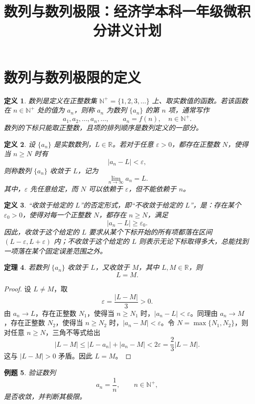 \documentclass[UTF8,fontset=fandol,11pt]{ctexart}
\title{数列与数列极限：经济学本科一年级微积分讲义计划}
\date{}
\newtheorem{definition}{定义}[section]
\newtheorem{theorem}[definition]{定理}
\newtheorem{example}[definition]{例题}
\begin{document}
\maketitle
\section{数列与数列极限的定义}\label{sec:S01}
\begin{definition}
\label{def:sequence}数列是定义在正整数集 $\mathbb{N}^{+}=\{1,2,3,\ldots\}$ 上、取实数值的函数。若该函数在 $n\in\mathbb{N}^{+}$ 处的值为 $a_n$，则称 $a_n$ 为数列 $\{a_n\}$ 的第 $n$ 项，通常写作
\[
a_1,a_2,\ldots,a_n,\ldots,
\qquad a_n=f(n),\quad n\in\mathbb{N}^{+}.
\]
数列的下标只能取正整数，且项的排列顺序是数列定义的一部分。
\end{definition}
\begin{definition}
\label{def:sequence-limit}\label{def:epsilon-N}设 $\{a_n\}$ 是实数数列，$L\in\mathbb{R}$。若对于任意 $\varepsilon>0$，都存在正整数 $N$，使得当 $n\geq N$ 时有
\[
|a_n-L|<\varepsilon,
\]
则称数列 $\{a_n\}$ 收敛于 $L$，记为
\[
\lim_{n\to\infty}a_n=L.
\]
其中，$\varepsilon$ 先任意给定，而 $N$ 可以依赖于 $\varepsilon$，但不能依赖于 $n$。
\end{definition}
\begin{definition}
“收敛于给定的 $L$”的否定形式，即“不收敛于给定的 $L$”，是：存在某个 $\varepsilon_0>0$，使得对每一个正整数 $N$，都存在 $n\geq N$，满足
\[
|a_n-L|\geq\varepsilon_0.
\]
因此，收敛于这个给定的 $L$ 要求从某个下标开始的所有项都落在区间 $(L-\varepsilon,L+\varepsilon)$ 内；不收敛于这个给定的 $L$ 则表示无论下标取得多大，总能找到一项落在某个固定误差范围之外。
\end{definition}
\begin{theorem}
\label{thm:limit-unique}若数列 $\{a_n\}$ 收敛于 $L$，又收敛于 $M$，其中 $L,M\in\mathbb{R}$，则
\[
L=M.
\]
\end{theorem}
\begin{proof}
设 $L\ne M$，取
\[
\varepsilon=\frac{|L-M|}{3}>0.
\]
由 $a_n\to L$，存在正整数 $N_1$，使得当 $n\geq N_1$ 时，$|a_n-L|<\varepsilon$。同理由 $a_n\to M$，存在正整数 $N_2$，使得当 $n\geq N_2$ 时，$|a_n-M|<\varepsilon$。令 $N=\max\{N_1,N_2\}$，则对任意 $n\geq N$，三角不等式给出
\[
|L-M|\leq |L-a_n|+|a_n-M|<2\varepsilon=\frac{2}{3}|L-M|.
\]
这与 $|L-M|>0$ 矛盾。因此 $L=M$。
\end{proof}
\begin{example}
验证数列
\[
a_n=\frac{1}{n},\qquad n\in\mathbb{N}^{+},
\]
是否收敛，并判断其极限。
\end{example}
\end{document}
